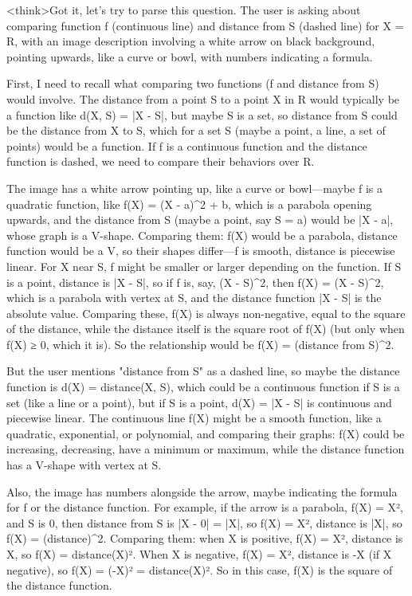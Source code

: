 <think>Got it, let's try to parse this question. The user is asking about comparing function f (continuous line) and distance from S (dashed line) for X = R, with an image description involving a white arrow on black background, pointing upwards, like a curve or bowl, with numbers indicating a formula. 

First, I need to recall what comparing two functions (f and distance from S) would involve. The distance from a point S to a point X in R would typically be a function like d(X, S) = |X - S|, but maybe S is a set, so distance from S could be the distance from X to S, which for a set S (maybe a point, a line, a set of points) would be a function. If f is a continuous function and the distance function is dashed, we need to compare their behaviors over R.

The image has a white arrow pointing up, like a curve or bowl—maybe f is a quadratic function, like f(X) = (X - a)^2 + b, which is a parabola opening upwards, and the distance from S (maybe a point, say S = a) would be |X - a|, whose graph is a V-shape. Comparing them: f(X) would be a parabola, distance function would be a V, so their shapes differ—f is smooth, distance is piecewise linear. For X near S, f might be smaller or larger depending on the function. If S is a point, distance is |X - S|, so if f is, say, (X - S)^2, then f(X) = (X - S)^2, which is a parabola with vertex at S, and the distance function |X - S| is the absolute value. Comparing these, f(X) is always non-negative, equal to the square of the distance, while the distance itself is the square root of f(X) (but only when f(X) ≥ 0, which it is). So the relationship would be f(X) = (distance from S)^2. 

But the user mentions "distance from S" as a dashed line, so maybe the distance function is d(X) = distance(X, S), which could be a continuous function if S is a set (like a line or a point), but if S is a point, d(X) = |X - S| is continuous and piecewise linear. The continuous line f(X) might be a smooth function, like a quadratic, exponential, or polynomial, and comparing their graphs: f(X) could be increasing, decreasing, have a minimum or maximum, while the distance function has a V-shape with vertex at S. 

Also, the image has numbers alongside the arrow, maybe indicating the formula for f or the distance function. For example, if the arrow is a parabola, f(X) = X², and S is 0, then distance from S is |X - 0| = |X|, so f(X) = X², distance is |X|, so f(X) = (distance)^2. Comparing them: when X is positive, f(X) = X², distance is X, so f(X) = distance(X)². When X is negative, f(X) = X², distance is -X (if X negative), so f(X) = (-X)² = distance(X)². So in this case, f(X) is the square of the distance function. 

